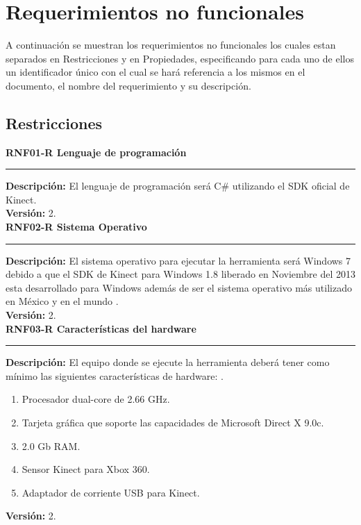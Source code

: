 \section{Requerimientos no funcionales}

A continuación se muestran los requerimientos no funcionales los cuales estan separados en Restricciones y en Propiedades, especificando para cada uno de ellos un identificador único con el cual se hará referencia a los mismos en el documento, el nombre del requerimiento y su descripción.

\subsection{Restricciones}

\textbf{\textcolor[rgb]{0, 0, 0.545098}{RNF01-R \hspace{2cm} Lenguaje de programación}}\\
\rule[3mm]{17cm}{0.1mm}
\label{rnf:RNF01-R}
\textbf{Descripción: } El lenguaje de programación será C\# utilizando el SDK oficial de Kinect. \\
\textbf{Versión: } 2. \\

\textbf{\textcolor[rgb]{0, 0, 0.545098}{RNF02-R \hspace{2cm} Sistema Operativo}}\\
\rule[3mm]{17cm}{0.1mm}
\label{rnf:RNF02-R}
\textbf{Descripción: } El sistema operativo para ejecutar la herramienta será Windows 7 debido a que el SDK de Kinect para Windows 1.8  liberado en Noviembre del 2013 esta desarrollado para Windows además de ser el sistema operativo más utilizado en México y en el mundo \cite{WindowsSeven}. \\
\textbf{Versión: } 2. \\

\textbf{\textcolor[rgb]{0, 0, 0.545098}{RNF03-R \hspace{2cm} Características del hardware}}\\
\rule[3mm]{17cm}{0.1mm}
\label{rnf:RNF03-R}
\textbf{Descripción: } El equipo donde se ejecute la herramienta deberá tener como mínimo las siguientes características de hardware: \cite{Webb}. 
\begin{enumerate}
	\item Procesador dual-core de 2.66 GHz.
	\item Tarjeta gráfica que soporte las capacidades de Microsoft Direct X 9.0c.
	\item 2.0 Gb RAM.
	\item Sensor Kinect para Xbox 360.
	\item Adaptador de corriente USB para Kinect.
\end{enumerate} 
\textbf{Versión: } 2. \\

